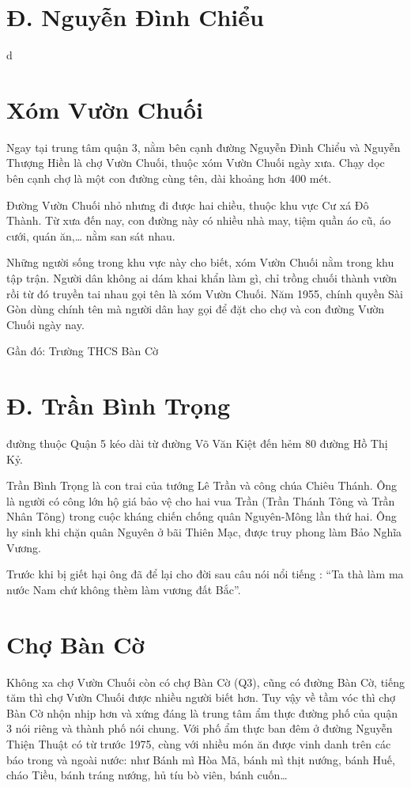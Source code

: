 \section{Đ. Nguyễn Đình Chiểu}

d

\section{Xóm Vườn Chuối}

Ngay tại trung tâm quận 3, nằm bên cạnh đường Nguyễn Đình Chiểu và Nguyễn Thượng Hiền là chợ Vườn Chuối, thuộc xóm Vườn Chuối ngày xưa. Chạy dọc bên cạnh chợ là một con đường cùng tên, dài khoảng hơn 400 mét.

Đường Vườn Chuối nhỏ nhưng đi được hai chiều, thuộc khu vực Cư xá Đô Thành. Từ xưa đến nay, con đường này có nhiều nhà may, tiệm quần áo cũ, áo cưới, quán ăn,… nằm san sát nhau.

Những người sống trong khu vực này cho biết, xóm Vườn Chuối nằm trong khu tập trận. Người dân không ai dám khai khẩn làm gì, chỉ trồng chuối thành vườn rồi từ đó truyền tai nhau gọi tên là xóm Vườn Chuối. Năm 1955, chính quyền Sài Gòn dùng chính tên mà người dân hay gọi để đặt cho chợ và con đường Vườn Chuối ngày nay.

Gần đó: Trường THCS Bàn Cờ

\section{Đ. Trần Bình Trọng}

đường thuộc Quận 5 kéo dài từ đường Võ Văn Kiệt đến hẻm 80 đường Hồ Thị Kỷ.

Trần Bình Trọng là con trai của tướng Lê Trần và công chúa Chiêu Thánh. Ông là người có công lớn hộ giá bảo vệ cho hai vua Trần (Trần Thánh Tông và Trần Nhân Tông) trong cuộc kháng chiến chống quân Nguyên-Mông lần thứ hai. Ông hy sinh khi chặn quân Nguyên ở bãi Thiên Mạc, được truy phong làm Bảo Nghĩa Vương.

Trước khi bị giết hại ông đã để lại cho đời sau câu nói nổi tiếng : “Ta thà làm ma nước Nam chứ không thèm làm vương đất Bắc”.

\section{Chợ Bàn Cờ}

Không xa chợ Vườn Chuối còn có chợ Bàn Cờ (Q3), cũng có đường Bàn Cờ, tiếng tăm thì chợ Vườn Chuối được nhiều người biết hơn. Tuy vậy về tầm vóc thì chợ Bàn Cờ nhộn nhịp hơn và xứng đáng là trung tâm ẩm thực đường phố của quận 3 nói riêng và thành phố nói chung. Với phố ẩm thực ban đêm ở đường Nguyễn Thiện Thuật có từ trước 1975, cùng với nhiều món ăn được vinh danh trên các báo trong và ngoài nước: như Bánh mì Hòa Mã, bánh mì thịt nướng, bánh Huế, cháo Tiều, bánh tráng nướng, hủ tíu bò viên, bánh cuốn…

